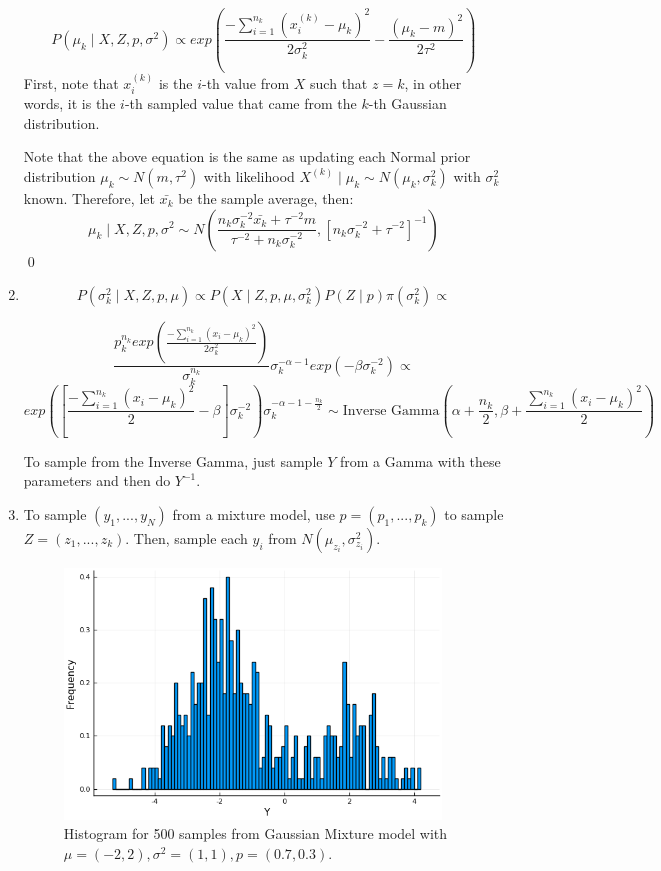 \documentclass[12pt,letterpaper]{article}
\begin{document}
\begin{enumerate}[leftmargin=!,labelindent=5pt]
$$
P(\mu_k \mid X, Z, p, \sigma^2) \propto
exp \left(
	\frac{-\sum_{i=1}^{n_k}(x_i^{(k)} - \mu_k)^2}{2\sigma_k^2} -
	\frac{(\mu_k - m)^2}{2\tau^2}
\right)
$$
First, note that $x_i^{(k)}$ is the $i$-th value from $X$ such
that $z = k$, in other words, it is the $i$-th sampled value that came
from the $k$-th Gaussian distribution.

Note that the above equation is the same as updating each
Normal
prior distribution $\mu_k \sim N(m, \tau^2)$ with likelihood
$X^{(k)} \mid \mu_k \sim N(\mu_k, \sigma^2_k)$ with $\sigma^2_k$ known.
Therefore, let $\bar{x_k}$ be the sample average, then:
$$\mu_k \mid X, Z, p,\sigma^2
\sim N\left(
\frac{n_k \sigma_k ^{-2}\bar{x_k} + \tau^{-2}m}
{\tau^{-2} + n_k\sigma^{-2}_k}
, [n_k\sigma_k^{-2} + \tau^{-2}]^{-1}
\right)$$
\qed

\item 

$$
P(\sigma_k ^2 \mid X, Z, p, \mu) \propto
P(X \mid Z, p, \mu, \sigma_k^2) P(Z \mid p) \pi(\sigma_k^2)
\propto
$$

$$
\frac{p_k^{n_k} exp\left(
	\frac{-\sum_{i=1}^{n_k}(x_i - \mu_k)^2}{2\sigma^2_k}
\right)}
{\sigma_k^{n_k}}
\sigma_k^{-\alpha -1}exp(-\beta \sigma_k^{-2}) \propto
$$
$$
exp \left( 
\left [
	\frac{-\sum_{i=1}^{n_k}(x_i - \mu_k)^2}{2}
	- \beta
\right] \sigma_k^{-2}
\right)
\sigma_k^{-\alpha -1 - \frac{n_k}{2}} \sim
\text{Inverse Gamma}\left(
\alpha + \frac{n_k}{2}, \beta +
\frac{\sum_{i=1}^{n_k}(x_i - \mu_k)^2}{2}
\right)
$$

To sample from the Inverse Gamma, just sample $Y$ from a Gamma with these
parameters and then do $Y^{-1}$.

\item To sample $(y_1,...,y_N)$ from a mixture model,
use $p = (p_1,...,p_k)$ to sample $Z = (z_1,...,z_k)$. Then,
sample each $y_i$ from $N(\mu_{z_i},\sigma^2_{z_i})$.
\begin{figure}[H]
    \centering
    \includegraphics[width=10cm]{images/Ex6.png}
    \caption{Histogram for 500 samples from
    Gaussian Mixture model with
    $\mu = (-2, 2),\sigma^2 =(1,1), p = (0.7,0.3)$.
    }
    \label{fig:1}
\end{figure}


\end{enumerate}
\end{document}
